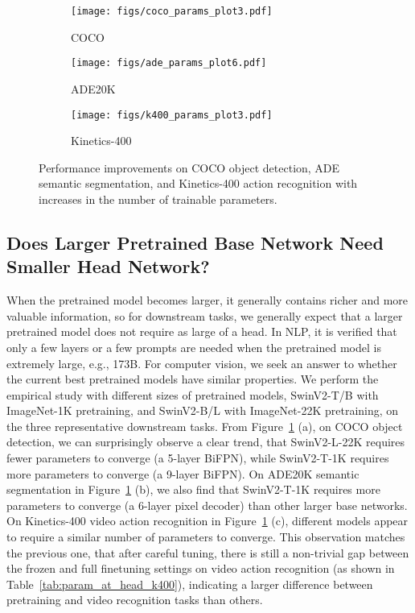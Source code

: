 \documentclass{article}
\begin{document}
\begin{figure}[h]
    \centering
    \begin{subfigure}[b]{0.32\textwidth}
        \centering
        \texttt{[image: figs/coco\_params\_plot3.pdf]}
        \caption{COCO}
    \end{subfigure}
    \hfill
    \begin{subfigure}[b]{0.32\textwidth}
        \centering
        \texttt{[image: figs/ade\_params\_plot6.pdf]}
        \caption{ADE20K}
    \end{subfigure}
    \hfill
    \begin{subfigure}[b]{0.32\textwidth}
        \centering
        \texttt{[image: figs/k400\_params\_plot3.pdf]}
        \caption{Kinetics-400}
    \end{subfigure}
    \caption{Performance improvements on COCO object detection, ADE semantic segmentation, and Kinetics-400 action recognition with increases in the number of trainable parameters.}
    \label{fig:param_head}
\end{figure}

\subsection{Does Larger Pretrained Base Network Need Smaller Head Network?} 
When the pretrained model becomes larger, it generally contains richer and more valuable information, so for downstream tasks, we generally expect that a larger pretrained model does not require as large of a head. In NLP, it is verified that only a few layers or a few prompts are needed when the pretrained model is extremely large, e.g., 173B. For computer vision, we seek an answer to whether the current best pretrained models have similar properties. We perform the empirical study with different sizes of pretrained models, SwinV2-T/B with ImageNet-1K pretraining, and SwinV2-B/L with ImageNet-22K pretraining, on the three representative downstream tasks. 
From Figure~\ref{fig:param_head} (a), on COCO object detection, we can surprisingly observe a clear trend, that SwinV2-L-22K requires fewer parameters to converge (a 5-layer BiFPN), while SwinV2-T-1K requires more parameters to converge (a 9-layer BiFPN).
On ADE20K semantic segmentation in Figure~\ref{fig:param_head} (b), we also find that SwinV2-T-1K requires more parameters to converge (a 6-layer pixel decoder) than other larger base networks.
On Kinetics-400 video action recognition in Figure~\ref{fig:param_head} (c), different models appear to require a similar number of parameters to converge. This observation matches the previous one, that after careful tuning, there is still a non-trivial gap between the frozen and full finetuning settings on video action recognition (as shown in Table~\ref{tab:param_at_head_k400}), indicating a larger difference between pretraining and video recognition tasks than others.
\end{document}
